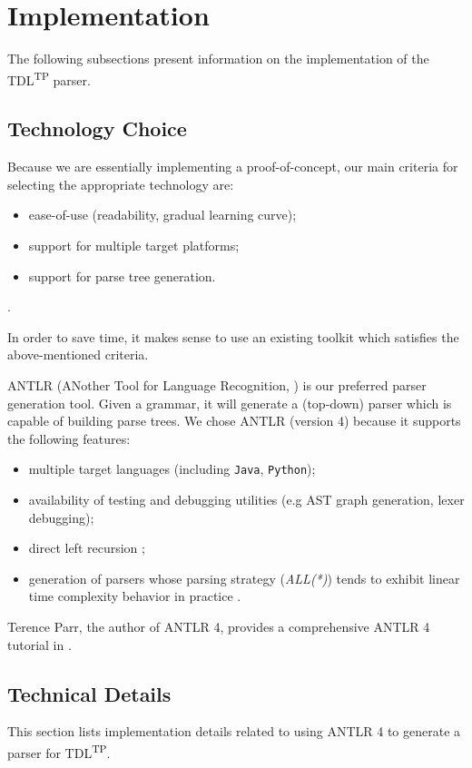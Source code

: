 \documentclass[12pt,oneside,a4paper,notitlepage]{report}
\begin{document}
	\section*{Implementation}
	\par The following subsections present information on the implementation of the TDL\textsuperscript{TP} parser.

	\subsection*{Technology Choice}
	\par Because we are essentially implementing a proof-of-concept, our main criteria for selecting the appropriate technology are:
	\begin{itemize}
		\item ease-of-use (readability, gradual learning curve);
		\item support for multiple target platforms;
		\item support for parse tree generation.
	\end{itemize}.

	\par In order to save time, it makes sense to use an existing toolkit which satisfies the above-mentioned criteria.

	\bigskip

	\par ANTLR (ANother Tool for Language Recognition, \cite{antlrsite}) is our preferred parser generation tool. Given a grammar, it will generate a (top-down) parser which is capable of building parse trees. We chose ANTLR (version 4) because it supports the following features:
	\begin{itemize}
		\item multiple target languages (including \texttt{Java}, \texttt{Python});
		\item availability of testing and debugging utilities (e.g AST graph generation, lexer debugging);
		\item direct left recursion \cite{antlrrecursion};
		\item generation of parsers whose parsing strategy (\textit{ALL(*)}) tends to exhibit linear time complexity behavior in practice \cite{antlrcomplex}.
	\end{itemize}

	Terence Parr, the author of ANTLR 4, provides a comprehensive ANTLR 4 tutorial in \cite{antlrtutorial}.

	\subsection*{Technical Details}
	\par This section lists implementation details related to using ANTLR 4 to generate a parser for TDL\textsuperscript{TP}.
\end{document}

